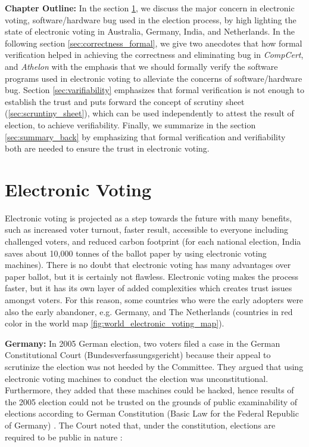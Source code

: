 
\textbf{Chapter Outline:}
 In the section \ref{sec:electronic_voting}, we discuss 
 the major concern in electronic voting, software/hardware 
 bug used in the election process, by high lighting the 
 state of electronic voting in Australia, Germany, India, 
 and Netherlands. In the following section \ref{sec:correctness_formal}, we  give 
 two anecdotes that how formal verification helped in achieving 
 the correctness and eliminating bug in \textit{CompCert}, 
 and \textit{Athelon} with 
 the emphasis that we should formally verify the software programs
 used in electronic voting to alleviate the concerns of 
 software/hardware bug. Section \ref{sec:varifiability} 
 emphasizes that formal verification is not enough
 to establish the trust and puts forward the concept of 
 scrutiny sheet (\ref{sec:scruntiny_sheet}), which 
 can be used independently to attest the result of election, 
 to achieve verifiability. Finally, we summarize in the section \ref{sec:summary_back}
 by emphasizing that formal verification and verifiability both are needed 
 to ensure the trust in electronic voting. 
 
  

\section{Electronic Voting}
 \label{sec:electronic_voting}
  Electronic voting is projected as a step towards the future with 
  many benefits, such as increased voter turnout, faster result, 
  accessible to everyone including challenged voters, and reduced 
  carbon footprint (for each 
  national election, India saves about 10,000 tonnes of the ballot 
  paper by using electronic voting machines). 
  There is no doubt that electronic voting has many advantages 
  over paper ballot, but it is certainly not flawless.  
  Electronic voting makes 
  the process faster, but it has its own layer of added complexities 
  which creates trust issues amongst voters. For this reason, some countries 
  who were the early adopters were also the early abandoner, e.g.
  Germany, and The Netherlands (countries in red color in the world map 
  \ref{fig:world_electronic_voting_map}).
  
  
  \textbf{Germany:} In 2005 German election, two voters filed a case in the German 
  Constitutional Court (Bundesverfassungsgericht) because their 
  appeal to scrutinize the election 
  was not heeded by the Committee. They argued that using electronic 
  voting machines to conduct the election was unconstitutional. Furthermore,
  they added that
  these machines could be hacked, hence results of the 2005 election 
  could not be trusted on the grounds 
  of public examinability of elections according to German Constitution 
  (Basic Law for the Federal Republic of Germany) \citep{Germanconst}. 
  The Court noted that, under the constitution, elections are 
  required to be public in nature \citep{Germanconst}:
  
